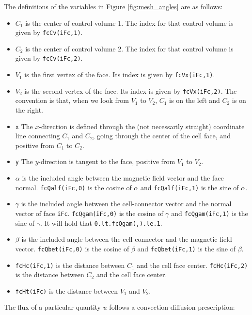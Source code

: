 The definitions of the variables in Figure \ref{fig:mesh_angles} are as follows:

\begin{itemize}
\item {\tt $C_1$} is the center of control volume 1. The index for that control volume is given by {\tt fcCv(iFc,1)}.
\item {\tt $C_2$} is the center of control volume 2. The index for that control volume is given by {\tt fcCv(iFc,2)}.
\item {\tt $V_1$} is the first vertex of the face. Its index is given by {\tt fcVx(iFc,1)}.
\item {\tt $V_2$} is the second vertex of the face. Its index is given by {\tt fcVx(iFc,2)}. The convention is that, when we look from {\tt $V_1$} to {\tt $V_2$}, {\tt $C_1$} is on the left and {\tt $C_2$} is on the right.
\item {\tt x} The $x$-direction is defined through the (not necessarily straight)
coordinate line connecting {\tt $C_1$} and {\tt $C_2$}, going through the center of the
cell face, and positive from {\tt $C_1$} to {\tt $C_2$}.
\item {\tt y} The $y$-direction is tangent to the face, positive from {\tt $V_1$} to {\tt $V_2$}.
\item {\tt $\alpha$} is the included angle between the magnetic field vector and the face normal.
{\tt fcQalf(iFc,0)} is the cosine of {\tt $\alpha$} and {\tt fcQalf(iFc,1)} is the sine of {\tt $\alpha$}.
\item {\tt $\gamma$} is the included angle between the cell-connector vector and the normal vector
of face {\tt iFc}. {\tt fcQgam(iFc,0)} is the cosine of {\tt $\gamma$} and {\tt fcQgam(iFc,1)} is the sine of {\tt $\gamma$}. It will hold that {\tt 0.lt.fcQgam(,).le.1}.
\item {\tt $\beta$} is the included angle between the cell-connector and the magnetic field vector.
{\tt fcQbet(iFc,0)} is the cosine of {\tt $\beta$} and {\tt fcQbet(iFc,1)} is the sine of {\tt $\beta$}.
\item {\tt fcHc(iFc,1)} is the distance between {\tt $C_1$} and the cell face center. {\tt fcHc(iFc,2)} is the distance between {\tt $C_2$} and the cell face center.
\item {\tt fcHt(iFc)} is the distance between {\tt $V_1$} and {\tt $V_2$}.
\end{itemize}

The flux of a particular quantity $u$ follows a convection-diffusion prescription:

